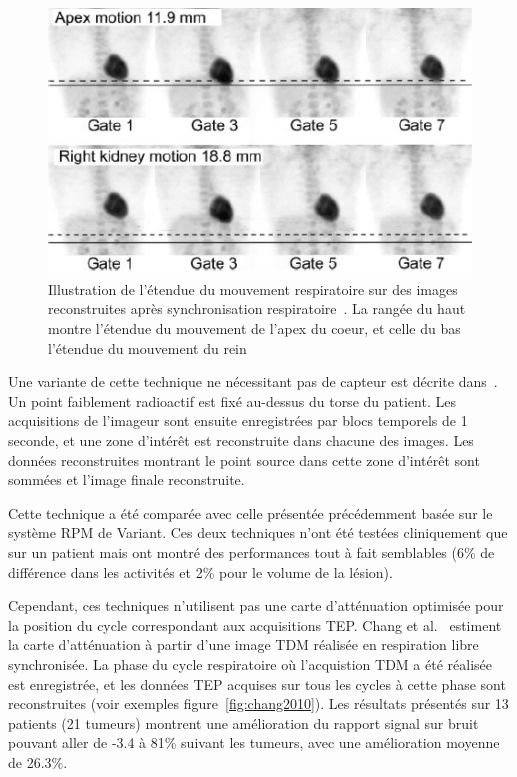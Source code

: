 \begin{figure}[h!]
	\begin{center}
		\includegraphics[width=12cm]{images/gatingBoucher2004}
	\end{center}
	\caption{Illustration de l'étendue du mouvement respiratoire sur des images reconstruites après synchronisation respiratoire~\cite{boucher2004respiratory}. La rangée du haut montre l'étendue du mouvement de l'apex du coeur, et celle du bas l'étendue du mouvement du rein} 
	\label{fig:boucher2004}
\end{figure}

Une variante de cette technique ne nécessitant pas de capteur est décrite dans~\cite{nehmeh2003reduction}. Un point faiblement radioactif est fixé au-dessus du torse du patient. Les acquisitions de l'imageur sont ensuite enregistrées par blocs temporels de 1 seconde, et une zone d'intérêt est reconstruite dans chacune des images. Les données reconstruites montrant le point source dans cette zone d'intérêt sont sommées et l'image finale reconstruite. 

Cette technique a été comparée avec celle présentée précédemment basée sur le système RPM de Variant. Ces deux techniques n'ont été testées cliniquement que sur un patient mais ont montré des performances tout à fait semblables (6\% de différence dans les activités et 2\% pour le volume de la lésion).

Cependant, ces techniques n'utilisent pas une carte d'atténuation optimisée pour la position du cycle correspondant aux acquisitions TEP.  Chang et al.~\cite{GuopingChang2010Implementation} estiment la carte d'atténuation à partir d'une image TDM réalisée en respiration libre synchronisée. La phase du cycle respiratoire où l'acquistion TDM a été réalisée est enregistrée, et les données TEP acquises sur tous les cycles à cette phase sont reconstruites (voir exemples figure~\ref{fig:chang2010}). Les résultats présentés sur 13 patients (21 tumeurs) montrent une amélioration du rapport signal sur bruit pouvant aller de -3.4 à 81\% suivant les tumeurs, avec une amélioration moyenne de 26.3\%.

